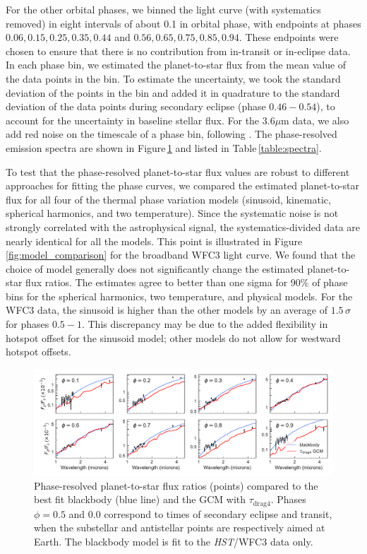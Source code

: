 \documentclass[twocolumn]{aastex61}
\newcommand{\project}[1]{\textsl{#1}}
\newcommand{\HST}{\project{HST}}
\begin{document}
For the other orbital phases, we binned the light curve (with systematics removed) in eight intervals of about 0.1 in orbital phase, with endpoints at phases $0.06, 0.15, 0.25, 0.35, 0.44$ and $0.56, 0.65, 0.75, 0.85, 0.94$. These endpoints were chosen to ensure that there is no contribution from in-transit or in-eclipse data.  In each phase bin, we estimated the planet-to-star flux from the mean value of the data points in the bin. To estimate the uncertainty, we took the standard deviation of the points in the bin and added it in quadrature to the standard deviation of the data points during secondary eclipse (phase $0.46-0.54$), to account for the uncertainty in baseline stellar flux.  For the $3.6\mu$m data, we also add red noise on the timescale of a phase bin, following \cite{pont06}.  The phase-resolved emission spectra are shown in Figure\,\ref{fig:spectra} and listed in Table\,\ref{table:spectra}. 

To test that the phase-resolved planet-to-star flux values are robust to different approaches for fitting the phase curves, we compared the estimated planet-to-star flux for all four of the thermal phase variation models (sinusoid, kinematic, spherical harmonics, and two temperature).  Since the systematic noise is not strongly correlated with the astrophysical signal, the systematics-divided data are nearly identical for all the models.  This point is illustrated in Figure\,\ref{fig:model_comparison} for the broadband WFC3 light curve.  We found that the choice of model generally does not significantly change the estimated planet-to-star flux ratios.  The estimates agree to better than one sigma for 90\% of phase bins for the spherical harmonics, two temperature, and physical models. For the WFC3 data, the sinusoid is higher than the other models by an average of $1.5\,\sigma$ for phases $0.5 - 1$. This discrepancy may be due to the added flexibility in hotspot offset for the sinusoid model; other models do not allow for westward hotspot offsets.

\begin{figure}
\includegraphics[width = 1.0\textwidth]{fig6.pdf}
\caption{Phase-resolved planet-to-star flux ratios (points) compared to the best fit blackbody (blue line) and the GCM with $\tau_\mathrm{drag4}$. Phases $\phi=0.5$ and $0.0$ correspond to times of secondary eclipse and transit, when the substellar and antistellar points are respectively aimed at Earth. The blackbody model is fit to the \HST/WFC3 data only.}
\label{fig:spectra}
\end{figure}
\end{document}
